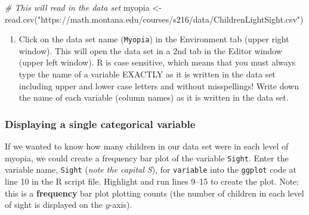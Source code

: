 \documentclass[
]{report}
\newenvironment{Shaded}{\begin{snugshade}}{\end{snugshade}}
\newcommand{\CommentTok}[1]{\textcolor[rgb]{0.56,0.35,0.01}{\textit{#1}}}
\newcommand{\FunctionTok}[1]{\textcolor[rgb]{0.00,0.00,0.00}{#1}}
\newcommand{\NormalTok}[1]{#1}
\newcommand{\OtherTok}[1]{\textcolor[rgb]{0.56,0.35,0.01}{#1}}
\newcommand{\StringTok}[1]{\textcolor[rgb]{0.31,0.60,0.02}{#1}}
\providecommand{\tightlist}{%
  \setlength{\itemsep}{0pt}\setlength{\parskip}{0pt}}
\begin{document}
\begin{Shaded}
\begin{Highlighting}[]
\CommentTok{\# This will read in the data set}
\NormalTok{myopia }\OtherTok{\textless{}{-}} \FunctionTok{read.csv}\NormalTok{(}\StringTok{"https://math.montana.edu/courses/s216/data/ChildrenLightSight.csv"}\NormalTok{) }
\end{Highlighting}
\end{Shaded}

\begin{enumerate}
\def\labelenumi{\arabic{enumi}.}
\setcounter{enumi}{1}
\tightlist
\item
  Click on the data set name (\texttt{Myopia}) in the Environment tab (upper right window). This will open the data set in a 2nd tab in the Editor window (upper left window). R is case sensitive, which means that you must always type the name of a variable EXACTLY as it is written in the data set including upper and lower case letters and without misspellings! Write down the name of each variable (column names) as it is written in the data set.
\end{enumerate}

\vspace{0.3in}

\hypertarget{displaying-a-single-categorical-variable}{%
\subsubsection*{Displaying a single categorical variable}\label{displaying-a-single-categorical-variable}}

If we wanted to know how many children in our data set were in each level of myopia, we could create a frequency bar plot of the variable \texttt{Sight}. Enter the variable name, \texttt{Sight} (\emph{note the capital S}), for \texttt{variable} into the \texttt{ggplot} code at line 10 in the R script file. Highlight and run lines 9--15 to create the plot. Note: this is a \textbf{frequency} bar plot plotting counts (the number of children in each level of sight is displayed on the \(y\)-axis).
\end{document}

